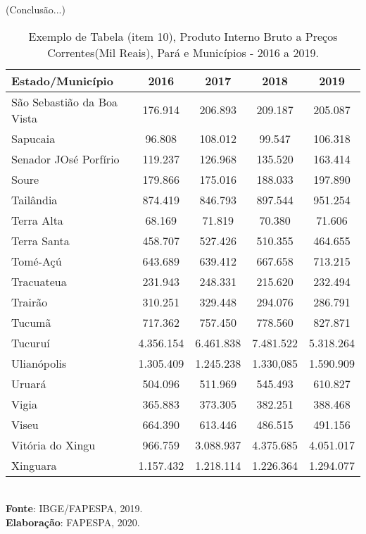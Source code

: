 \newpage
\begin{table}[!htb]
    \centering
    {
    \caption{Exemplo de Tabela (item 10), Produto Interno Bruto a Preços Correntes(Mil Reais), Pará e Municípios - 2016 a 2019.}  (Conclusão...)
    \label{item 10 regras5}
\begin{tabular}{l|c|c|c|c}
  \hline\hline
  Estado/Município            &    2016    &  2017   &  2018       &  2019    \\
  \hline\hline
   São Sebastião da Boa Vista &  176.914   &  206.893  & 209.187   & 205.087  \\
   Sapucaia                   &  96.808    & 108.012   & 99.547    & 106.318  \\
   Senador JOsé Porfírio      &  119.237   & 126.968   & 135.520   & 163.414  \\ 
   Soure                      &  179.866   & 175.016   & 188.033   & 197.890  \\
   Tailândia                  & 874.419    & 846.793   & 897.544   & 951.254  \\
   Terra Alta                 &  68.169    & 71.819    & 70.380    & 71.606  \\
   Terra Santa                &  458.707   & 527.426   & 510.355   & 464.655 \\
   Tomé-Açú                   &  643.689   & 639.412   & 667.658   & 713.215 \\
   Tracuateua                 &  231.943   & 248.331   & 215.620   & 232.494 \\
   Trairão                    &  310.251   & 329.448   & 294.076   & 286.791 \\
   Tucumã                     &  717.362   & 757.450     & 778.560   & 827.871 \\
   Tucuruí                    &  4.356.154 & 6.461.838   & 7.481.522 & 5.318.264 \\
   Ulianópolis                &  1.305.409 & 1.245.238   & 1.330,085 & 1.590.909 \\
   Uruará                     &  504.096   & 511.969     & 545.493   & 610.827  \\
   Vigia                      &  365.883   & 373.305     & 382.251   & 388.468 \\
   Viseu                      &  664.390   & 613.446     & 486.515   &  491.156 \\
   Vitória do Xingu           & 966.759    &  3.088.937  & 4.375.685 &  4.051.017  \\
   Xinguara                   & 1.157.432  & 1.218.114   & 1.226.364 & 1.294.077 \\
   \hline\hline
\end{tabular}}
\\
\hspace{-7.5cm}
\textbf{Fonte}: IBGE/FAPESPA, 2019. \\
\hspace{-7.5cm}
\textbf{Elaboração}: FAPESPA, 2020.
\end{table}






